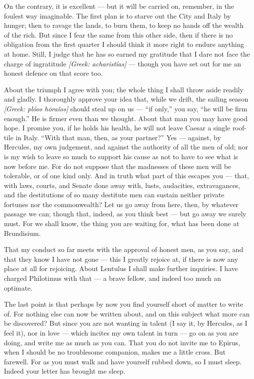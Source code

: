  On the contrary, it is excellent --- but it will be carried on, remember, in the foulest way imaginable. The first plan is to starve out the City and Italy by hunger; then to ravage the lands, to burn them, to keep no hands off the wealth of the rich. But since I fear the same from this other side, then if there is no obligation from the first quarter I should think it more right to endure anything at home. Still, I judge that he has so earned my gratitude that I dare not face the charge of ingratitude \textit{[Greek: acharist\'ias]} --- though you have set out for me an honest defence on that score too.

 About the triumph I agree with you; the whole thing I shall throw aside readily and gladly. I thoroughly approve your idea that, while we drift, the sailing season \textit{[Greek: pl\'oos h\=ora\^ios]} should steal up on us --- ``if only,'' you say, ``he will be firm enough.'' He is firmer even than we thought. About that man you may have good hope. I promise you, if he holds his health, he will not leave Caesar a single roof-tile in Italy. ``With that man, then, as your partner?'' Yes --- against, by Hercules, my own judgement, and against the authority of all the men of old; nor is my wish to leave so much to support his cause as not to have to see what is now before me. For do not suppose that the madnesses of these men will be tolerable, or of one kind only. And in truth what part of this escapes you --- that, with laws, courts, and Senate done away with, lusts, audacities, extravagances, and the destitutions of so many destitute men can sustain neither private fortunes nor the commonwealth? Let us go away from here, then, by whatever passage we can; though that, indeed, as you think best --- but go away we surely must. For we shall know, the thing you are waiting for, what has been done at Brundisium.

 That my conduct so far meets with the approval of honest men, as you say, and that they know I have not gone --- this I greatly rejoice at, if there is now any place at all for rejoicing. About Lentulus I shall make further inquiries. I have charged Philotimus with that --- a brave fellow, and indeed too much an optimate.

 The last point is that perhaps by now you find yourself short of matter to write of. For nothing else can now be written about, and on this subject what more can be discovered? But since you are not wanting in talent (I say it, by Hercules, as I feel it), nor in love --- which incites my own talent in turn --- go on as you are doing, and write me as much as you can. That you do not invite me to Epirus, when I should be no troublesome companion, makes me a little cross. But farewell. For as you must walk and have yourself rubbed down, so I must sleep. Indeed your letter has brought me sleep.
